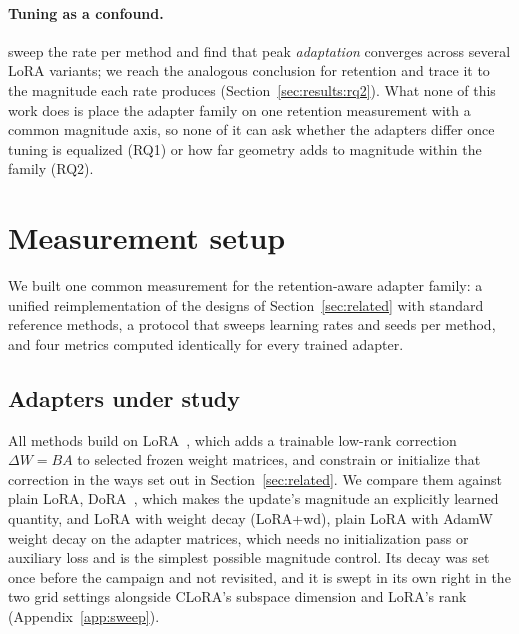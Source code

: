 \documentclass[11pt]{article}
\begin{document}
\paragraph{Tuning as a confound.} \citet{lee2026lr} sweep the rate per method
and find that peak \emph{adaptation} converges across several LoRA variants;
we reach the analogous conclusion for retention and trace it to the magnitude
each rate produces (Section~\ref{sec:results:rq2}). What none of this work does is place the
adapter family on one retention measurement with a common magnitude axis, so
none of it can ask whether the adapters differ once tuning is equalized (RQ1)
or how far geometry adds to magnitude within the family (RQ2).

\section{Measurement setup}\label{sec:method}


We built one common measurement for the retention-aware adapter family: a
unified reimplementation of the designs of Section~\ref{sec:related} with
standard reference methods, a protocol that sweeps learning rates and seeds
per method, and four metrics computed identically for every trained adapter.

\subsection{Adapters under study}\label{sec:method:adapters}
All methods build on LoRA~\citep{hu2021lora}, which adds a trainable low-rank
correction $\Delta W = BA$ to selected frozen weight matrices, and constrain or
initialize that correction in the ways set out in Section~\ref{sec:related}. We
compare them against plain LoRA, DoRA~\citep{liu2024dora}, which makes the
update's magnitude an explicitly learned quantity, and LoRA with weight decay
(LoRA{+}wd), plain LoRA with AdamW weight decay on the adapter matrices, which
needs no initialization pass or auxiliary loss and is the simplest possible
magnitude control. Its decay was set once before the campaign and not revisited,
and it is swept in its own right in the two grid settings alongside CLoRA's
subspace dimension and LoRA's rank (Appendix~\ref{app:sweep}).
\end{document}
